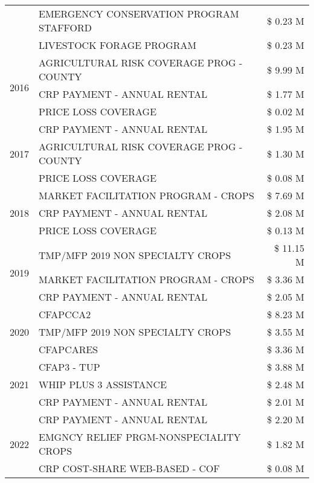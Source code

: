 \begin{tabular}{llr}
 & EMERGENCY CONSERVATION PROGRAM STAFFORD & \$ 0.23 M \\
 & LIVESTOCK FORAGE PROGRAM & \$ 0.23 M \\
\cline{1-3}
\multirow[t]{3}{*}{2016} & AGRICULTURAL RISK COVERAGE PROG - COUNTY & \$ 9.99 M \\
 & CRP PAYMENT - ANNUAL RENTAL & \$ 1.77 M \\
 & PRICE LOSS COVERAGE & \$ 0.02 M \\
\cline{1-3}
\multirow[t]{3}{*}{2017} & CRP PAYMENT - ANNUAL RENTAL & \$ 1.95 M \\
 & AGRICULTURAL RISK COVERAGE PROG - COUNTY & \$ 1.30 M \\
 & PRICE LOSS COVERAGE & \$ 0.08 M \\
\cline{1-3}
\multirow[t]{3}{*}{2018} & MARKET FACILITATION PROGRAM - CROPS & \$ 7.69 M \\
 & CRP PAYMENT - ANNUAL RENTAL & \$ 2.08 M \\
 & PRICE LOSS COVERAGE & \$ 0.13 M \\
\cline{1-3}
\multirow[t]{3}{*}{2019} & TMP/MFP 2019 NON SPECIALTY CROPS & \$ 11.15 M \\
 & MARKET FACILITATION PROGRAM - CROPS & \$ 3.36 M \\
 & CRP PAYMENT - ANNUAL RENTAL & \$ 2.05 M \\
\cline{1-3}
\multirow[t]{3}{*}{2020} & CFAPCCA2 & \$ 8.23 M \\
 & TMP/MFP 2019 NON SPECIALTY CROPS & \$ 3.55 M \\
 & CFAPCARES & \$ 3.36 M \\
\cline{1-3}
\multirow[t]{3}{*}{2021} & CFAP3 - TUP & \$ 3.88 M \\
 & WHIP PLUS 3 ASSISTANCE & \$ 2.48 M \\
 & CRP PAYMENT - ANNUAL RENTAL & \$ 2.01 M \\
\cline{1-3}
\multirow[t]{3}{*}{2022} & CRP PAYMENT - ANNUAL RENTAL & \$ 2.20 M \\
 & EMGNCY RELIEF PRGM-NONSPECIALITY CROPS & \$ 1.82 M \\
 & CRP COST-SHARE WEB-BASED - COF & \$ 0.08 M \\
\cline{1-3}
\bottomrule
\end{tabular}
